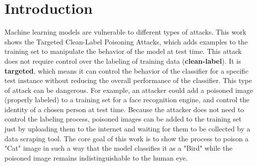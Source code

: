 \begin{abstract}
    This work shows an experiment where a poisoning attack is used on a binary image classifier trained with the CIFAR-10 dataset. The model is trained to recognize images as either "Bird" or "Cat". The experiment is based on the Poison Frogs attack (Algorithm 1). The main goal is to change a "Cat" image so that the model wrongly predicts it as a "Bird".


\end{abstract}

\section{Introduction}
Machine learning models are vulnerable to different types of attacks. This work shows the \textsf{Targeted Clean-Label Poisoning Attacks}, which adds examples to the training set to manipulate the behavior of the model at test time.
This attack does not require control over the labeling of training data (\textbf{clean-label}). It is \textbf{targeted}, which means it can control the behavior of the classifier for a specific test instance without reducing the overall performance of the classifier.
This type of attack can be dangerous. For example, an attacker could add a poisoned image (properly labeled) to a training set for a face recognition engine, and control the identity of a chosen person at test time. 
Because the attacker does not need to control the labeling process, poisoned images can be added to the training set just by uploading them to the internet and waiting for them to be collected by a data scraping tool. 
The core goal of this work is to show the process \textsf{to poison} a "Cat" image in such a way that the model classifies it as a "Bird" while the poisoned image remains indistinguishable to the human eye.
